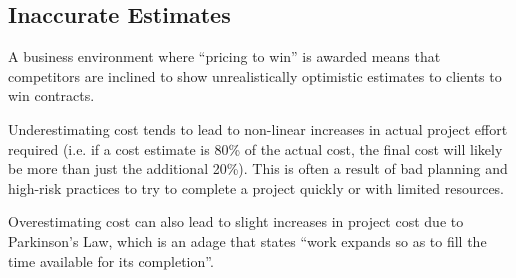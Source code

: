 \documentclass[12pt,titlepage]{article}
\begin{document}
    \subsection{Inaccurate Estimates}
      A business environment where ``pricing to win'' is awarded means that competitors are inclined to show unrealistically optimistic estimates to clients
      to win contracts.

      Underestimating cost tends to lead to non-linear increases in actual project effort required (i.e. if a cost estimate is 80\% of the actual cost, the
      final cost will likely be more than just the additional 20\%). This is often a result of bad planning and high-risk practices to try to complete a project
      quickly or with limited resources.

      Overestimating cost can also lead to slight increases in project cost due to Parkinson's Law, which is an adage that states ``work expands so as to fill
      the time available for its completion''.
\end{document}
